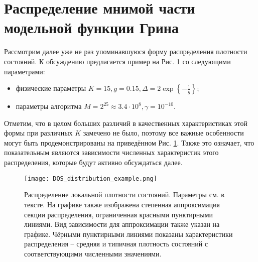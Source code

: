 \section{Распределение мнимой части модельной функции Грина}
Рассмотрим далее уже не раз упоминавшуюся форму распределения плотности состояний. К обсуждению предлагается пример на Рис. \ref{fig:DOS_distribution_example} со следующими параметрами:
\begin{itemize}
	\item физические параметры $K = 15, g = 0.15, \Delta = 2 \exp\left\{ -\frac{1}{g} \right\}$;
	\item параметры алгоритма $M = 2^{25} \approx 3.4 \cdot 10^{8}, \gamma = 10^{-10}$.
\end{itemize}
Отметим, что в целом больших различий в качественных характеристиках этой формы при различных $K$ замечено не было, поэтому все важные особенности могут быть продемонстрированы на приведённом Рис. \ref{fig:DOS_distribution_example}. Также это означает, что показательным являются зависимости численных характеристик этого распределения, которые будут активно обсуждаться далее. 

\begin{figure}[h!]
	\label{fig:DOS_distribution_example}
	\centering
	\texttt{[image: DOS\_distribution\_example.png]}
	\caption{Распределение локальной плотности состояний. Параметры см. в тексте. На графике также изображена степенная аппроксимация секции распределения, ограниченная красными пунктирными линиями. Вид зависимости для аппроксимации также указан на графике. Чёрными пунктирными линиями показаны характеристики распределения -- средняя и типичная плотность состояний с соответствующими численными значениями.}
\end{figure}

